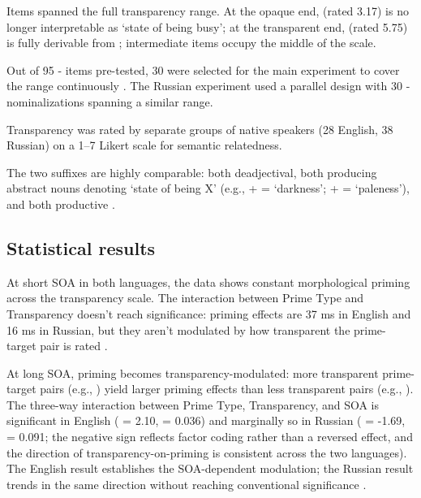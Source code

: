 Items spanned the full transparency range. At the opaque end,  (rated 3.17) is no longer interpretable as `state of being busy'; at the transparent end,  (rated 5.75) is fully derivable from ; intermediate items occupy the middle of the scale.

Out of 95 - items pre-tested, 30 were selected for the main experiment to cover the range continuously \autocite[1115]{heyer-kornishova-2018-priming-eventually}. The Russian experiment used a parallel design with 30 - nominalizations spanning a similar range.

Transparency was rated by separate groups of native speakers (28 English, 38 Russian) on a 1--7 Likert scale for semantic relatedness.

The two suffixes are highly comparable: both deadjectival, both producing abstract nouns denoting `state of being X' (e.g.,  +  = `darkness';  +  =  `paleness'), and both productive \autocite[1115]{heyer-kornishova-2018-priming-eventually}.

\subsection{Statistical results}\label{sec:C-3}

At short SOA in both languages, the data shows constant morphological priming across the transparency scale. The interaction between Prime Type and Transparency doesn't reach significance: priming effects are 37 ms in English and 16 ms in Russian, but they aren't modulated by how transparent the prime-target pair is rated \autocite[1117--1119]{heyer-kornishova-2018-priming-eventually}.

At long SOA, priming becomes transparency-modulated: more transparent prime-target pairs (e.g., ) yield larger priming effects than less transparent pairs (e.g., ). The three-way interaction between Prime Type, Transparency, and SOA is significant in English ( = 2.10,  = 0.036) and marginally so in Russian ( = -1.69,  = 0.091; the negative sign reflects factor coding rather than a reversed effect, and the direction of transparency-on-priming is consistent across the two languages). The English result establishes the SOA-dependent modulation; the Russian result trends in the same direction without reaching conventional significance \autocite[1117--1119]{heyer-kornishova-2018-priming-eventually}.


